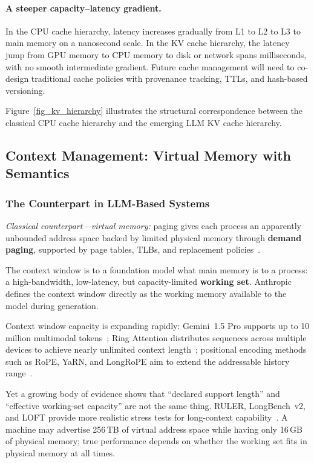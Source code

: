 \paragraph{A steeper capacity--latency gradient.}
In the CPU cache hierarchy, latency increases gradually from L1 to L2 to L3 to main memory on a nanosecond scale.
In the KV cache hierarchy, the latency jump from GPU memory to CPU memory to disk or network spans milliseconds, with no smooth intermediate gradient.
Future cache management will need to co-design traditional cache policies with provenance tracking, TTLs, and hash-based versioning.

Figure~\ref{fig_kv_hierarchy} illustrates the structural correspondence between the classical CPU cache hierarchy and the emerging LLM KV cache hierarchy.


\subsection{Context Management: Virtual Memory with Semantics}
\label{sec:memory}

\subsubsection{The Counterpart in LLM-Based Systems}

\textit{Classical counterpart---virtual memory:} paging gives each process an apparently unbounded address space backed by limited physical memory through \textbf{demand paging}, supported by page tables, TLBs, and replacement policies~\cite{ostep_2023}.

The context window is to a foundation model what main memory is to a process: a high-bandwidth, low-latency, but capacity-limited \textbf{working set}.
Anthropic defines the context window directly as the working memory available to the model during generation.

Context window capacity is expanding rapidly: Gemini~1.5 Pro supports up to 10 million multimodal tokens~\cite{gemini2024}; Ring Attention distributes sequences across multiple devices to achieve nearly unlimited context length~\cite{liu2024ringattention}; positional encoding methods such as RoPE, YaRN, and LongRoPE aim to extend the addressable history range~\cite{su2021roformer,yarn2024,longrope2024}.

Yet a growing body of evidence shows that ``declared support length'' and ``effective working-set capacity'' are not the same thing.
RULER, LongBench~v2, and LOFT provide more realistic stress tests for long-context capability~\cite{ruler2024,longbenchv2_2024,loft2024}.
A machine may advertise 256\,TB of virtual address space while having only 16\,GB of physical memory; true performance depends on whether the working set fits in physical memory at all times.

